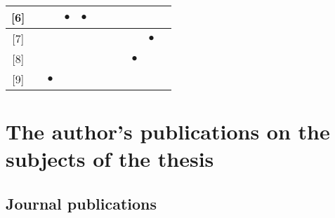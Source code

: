 \documentclass[12pt,a4paper]{extarticle}
\begin{document}
\begin{table}[h!]
\begin{tabular}{|c|c|c|c|c|c|c|c|c|c|c|}
{[}6{]}                               & \multicolumn{1}{c|}{}          & \multicolumn{1}{c|}{}          & \multicolumn{1}{c|}{$\bullet$} & \multicolumn{1}{c|}{$\bullet$} & \multicolumn{1}{c|}{}          & \multicolumn{1}{c|}{}          & \multicolumn{1}{c|}{}          & \multicolumn{1}{c|}{}          &           \\ \hline
{[}7{]}                               & \multicolumn{1}{c|}{}          & \multicolumn{1}{c|}{}          & \multicolumn{1}{c|}{}          & \multicolumn{1}{c|}{}          & \multicolumn{1}{c|}{}          & \multicolumn{1}{c|}{}          & \multicolumn{1}{c|}{}          & \multicolumn{1}{c|}{}          & $\bullet$ \\ \hline
{[}8{]}                               & \multicolumn{1}{c|}{}          & \multicolumn{1}{c|}{}          & \multicolumn{1}{c|}{}          & \multicolumn{1}{c|}{}          & \multicolumn{1}{c|}{}          & \multicolumn{1}{c|}{}          & \multicolumn{1}{c|}{}          & \multicolumn{1}{c|}{$\bullet$} &           \\ \hline
{[}9{]}                               & \multicolumn{1}{c|}{}          & \multicolumn{1}{c|}{$\bullet$} & \multicolumn{1}{c|}{}          & \multicolumn{1}{c|}{}          & \multicolumn{1}{c|}{}          & \multicolumn{1}{c|}{}          & \multicolumn{1}{c|}{}          & \multicolumn{1}{c|}{}          &           \\ \hline
\end{tabular}
\end{table}

\newpage
\section*{The author’s publications on the subjects of the thesis}

\vspace*{1em}

\subsection*{Journal publications}

\vspace*{1em}
\end{document}
